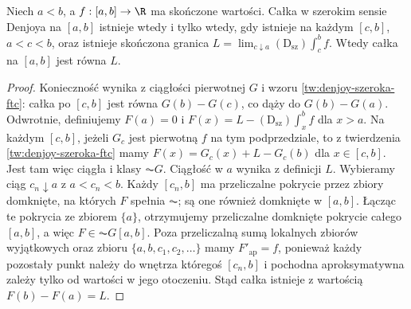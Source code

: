 \begin{twierdzenie}\label{ma1:kh:thm:wide-denjoy-hake}
Niech $a<b$, a $f:[a,b]\to\R$ ma skończone wartości. Całka w szerokim sensie Denjoya na $[a,b]$ istnieje wtedy i tylko wtedy, gdy istnieje na każdym $[c,b]$, $a<c<b$, oraz istnieje skończona granica
$L=\lim_{c\downarrow a}(\mathrm D_{\mathrm{sz}})\int_c^b f$.
Wtedy całka na $[a,b]$ jest równa $L$.
\end{twierdzenie}
\begin{proof}
Konieczność wynika z ciągłości pierwotnej $G$ i wzoru \ref{tw:denjoy-szeroka-ftc}: całka po $[c,b]$ jest równa $G(b)-G(c)$, co dąży do $G(b)-G(a)$. Odwrotnie, definiujemy $F(a)=0$ i $F(x)=L-(\mathrm D_{\mathrm{sz}})\int_x^b f$ dla $x>a$. Na każdym $[c,b]$, jeżeli $G_c$ jest pierwotną $f$ na tym podprzedziale, to z twierdzenia \ref{tw:denjoy-szeroka-ftc} mamy $F(x)=G_c(x)+L-G_c(b)$ dla $x\in[c,b]$. Jest tam więc ciągła i klasy $\AC G$. Ciągłość w $a$ wynika z definicji $L$. Wybieramy ciąg $c_n\downarrow a$ z $a<c_n<b$. Każdy $[c_n,b]$ ma przeliczalne pokrycie przez zbiory domknięte, na których $F$ spełnia $\AC$; są one również domknięte w $[a,b]$. Łącząc te pokrycia ze zbiorem $\{a\}$, otrzymujemy przeliczalne domknięte pokrycie całego $[a,b]$, a więc $F\in\AC G[a,b]$. Poza przeliczalną sumą lokalnych zbiorów wyjątkowych oraz zbioru $\{a,b,c_1,c_2,\ldots\}$ mamy $F'_{\mathrm{ap}}=f$, ponieważ każdy pozostały punkt należy do wnętrza któregoś $[c_n,b]$ i pochodna aproksymatywna zależy tylko od wartości w jego otoczeniu. Stąd całka istnieje z wartością $F(b)-F(a)=L$.
\end{proof}

